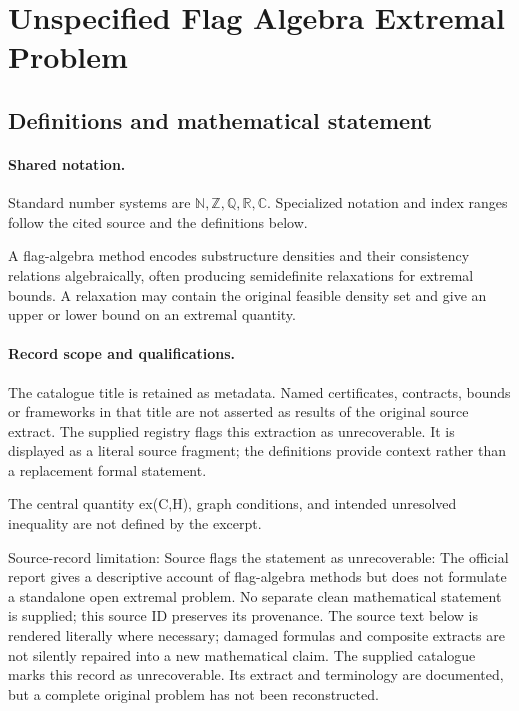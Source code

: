 \documentclass[11pt]{article}
\begin{document}
\section{Unspecified Flag Algebra Extremal Problem}\label{statement}

\subsection{Definitions and mathematical statement}

\paragraph{Shared notation.}Standard number systems are $\mathbb N,\mathbb Z,\mathbb Q,\mathbb R,\mathbb C$. Specialized notation and index ranges follow the cited source and the definitions below.


A flag-algebra method encodes substructure densities and their consistency relations algebraically, often producing semidefinite relaxations for extremal bounds. A relaxation may contain the original feasible density set and give an upper or lower bound on an extremal quantity.
\paragraph{Record scope and qualifications.}
The catalogue title is retained as metadata. Named certificates, contracts, bounds or frameworks in that title are not asserted as results of the original source extract.
The supplied registry flags this extraction as unrecoverable. It is displayed as a literal source fragment; the definitions provide context rather than a replacement formal statement.

The central quantity ex(C,H), graph conditions, and intended unresolved inequality are not defined by the excerpt.

Source-record limitation: Source flags the statement as unrecoverable: The official report gives a descriptive account of flag-algebra methods but does not formulate a standalone open extremal problem. No separate clean mathematical statement is supplied; this source ID preserves its provenance.
The source text below is rendered literally where necessary; damaged formulas and composite extracts are not silently repaired into a new mathematical claim.
The supplied catalogue marks this record as unrecoverable. Its extract and terminology are documented, but a complete original problem has not been reconstructed.
\end{document}
